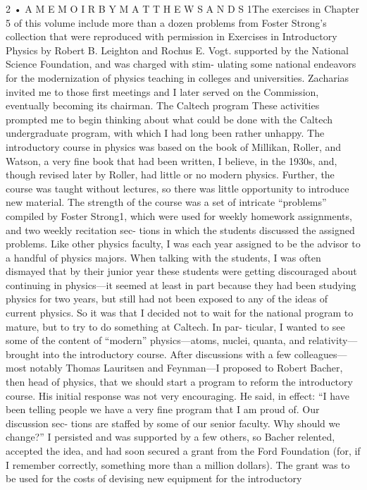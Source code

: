 \documentclass[11pt,oneside]{article}
\begin{document}
2 • A  M E M O I R  B Y  M A T T H E W  S A N D S 1The exercises in Chapter 5 of this volume include more than a dozen problems from Foster Strong’s collection that were reproduced with permission in Exercises in Introductory Physics by Robert B. Leighton and Rochus E. Vogt. supported by the National Science Foundation, and was charged with stim- ulating some national endeavors for the modernization of physics teaching in colleges and universities. Zacharias invited me to those first meetings and I later served on the Commission, eventually becoming its chairman. The Caltech program These activities prompted me to begin thinking about what could be done with the Caltech undergraduate program, with which I had long been rather unhappy. The introductory course in physics was based on the book of Millikan, Roller, and Watson, a very fine book that had been written, I believe, in the 1930s, and, though revised later by Roller, had little or no modern physics. Further, the course was taught without lectures, so there was little opportunity to introduce new material. The strength of the course was a set of intricate “problems” compiled by Foster Strong1, which were used for weekly homework assignments, and two weekly recitation sec- tions in which the students discussed the assigned problems. Like other physics faculty, I was each year assigned to be the advisor to a handful of physics majors. When talking with the students, I was often dismayed that by their junior year these students were getting discouraged about continuing in physics---it seemed at least in part because they had been studying physics for two years, but still had not been exposed to any of the ideas of current physics. So it was that I decided not to wait for the national program to mature, but to try to do something at Caltech. In par- ticular, I wanted to see some of the content of “modern” physics---atoms, nuclei, quanta, and relativity---brought into the introductory course. After discussions with a few colleagues---most notably Thomas Lauritsen and Feynman---I proposed to Robert Bacher, then head of physics, that we should start a program to reform the introductory course. His initial response was not very encouraging. He said, in effect: “I have been telling people we have a very fine program that I am proud of. Our discussion sec- tions are staffed by some of our senior faculty. Why should we change?” I persisted and was supported by a few others, so Bacher relented, accepted the idea, and had soon secured a grant from the Ford Foundation (for, if I remember correctly, something more than a million dollars). The grant was to be used for the costs of devising new equipment for the introductory\par
\end{document}
